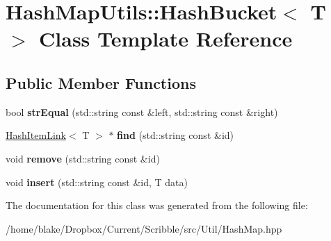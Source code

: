 \hypertarget{class_hash_map_utils_1_1_hash_bucket}{\section{Hash\-Map\-Utils\-:\-:Hash\-Bucket$<$ T $>$ Class Template Reference}
\label{class_hash_map_utils_1_1_hash_bucket}
}
\subsection*{Public Member Functions}
\begin{DoxyCompactItemize}
\item 
\hypertarget{class_hash_map_utils_1_1_hash_bucket_a939e10a16348fc29380553d9fd4e0f97}{bool {\bfseries str\-Equal} (std\-::string const \&left, std\-::string const \&right)}\label{class_hash_map_utils_1_1_hash_bucket_a939e10a16348fc29380553d9fd4e0f97}

\item 
\hypertarget{class_hash_map_utils_1_1_hash_bucket_a2e6dd28092f6b4ce37061f33a991fd45}{\hyperlink{class_hash_map_utils_1_1_hash_item_link}{Hash\-Item\-Link}$<$ T $>$ $\ast$ {\bfseries find} (std\-::string const \&id)}\label{class_hash_map_utils_1_1_hash_bucket_a2e6dd28092f6b4ce37061f33a991fd45}

\item 
\hypertarget{class_hash_map_utils_1_1_hash_bucket_a8757599c44e952ccbb0a404238b34bfa}{void {\bfseries remove} (std\-::string const \&id)}\label{class_hash_map_utils_1_1_hash_bucket_a8757599c44e952ccbb0a404238b34bfa}

\item 
\hypertarget{class_hash_map_utils_1_1_hash_bucket_a7ea13c55db34d280fd16b70c17bb2a62}{void {\bfseries insert} (std\-::string const \&id, T data)}\label{class_hash_map_utils_1_1_hash_bucket_a7ea13c55db34d280fd16b70c17bb2a62}

\end{DoxyCompactItemize}


The documentation for this class was generated from the following file\-:\begin{DoxyCompactItemize}
\item 
/home/blake/\-Dropbox/\-Current/\-Scribble/src/\-Util/Hash\-Map.\-hpp\end{DoxyCompactItemize}
